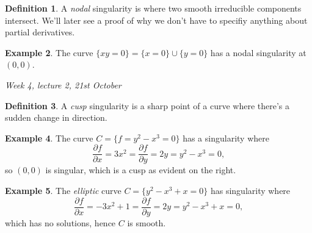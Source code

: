\documentclass{article}
\theoremstyle{definition}
\newtheorem{defn}{Definition}[subsection]
\newtheorem{example}[defn]{Example}
\begin{document}
\begin{defn}
A \textit{nodal} singularity is where two smooth irreducible components intersect. We'll later see a proof of why we don't have to specifiy anything about partial derivatives.
\end{defn}
\begin{example}
The curve $\{xy=0\}=\{x=0\}\cup\{y=0\}$ has a nodal singularity at $(0,0)$.
\end{example}

\begin{flushright}
\textit{Week 4, lecture 2, 21st October}
\end{flushright}

\begin{minipage}{0.75\textwidth}
\begin{defn}
A \textit{cusp} singularity is a sharp point of a curve where there's a sudden change in direction.
\end{defn}
\begin{example}
The curve $C=\{f=y^2-x^3=0\}$ has a singularity where
\[
\frac{\partial f}{\partial x}=3x^2=\frac{\partial f}{\partial y}=2y=y^2-x^3=0,
\]
so $(0,0)$ is singular, which is a cusp as evident on the right.
\end{example}
\end{minipage}
\begin{minipage}{0.25\textwidth}
\end{minipage}

\begin{minipage}{0.75\textwidth}
\begin{example}
The \textit{elliptic} curve $C=\{y^2-x^3+x=0\}$ has singularity where
\[
\frac{\partial f}{\partial x}=-3x^2+1=\frac{\partial f}{\partial y}=2y=y^2-x^3+x=0,
\]
which has no solutions, hence $C$ is smooth. 
\end{example}
\end{minipage}
\begin{minipage}{0.25\textwidth}
\end{minipage}
\end{document}
